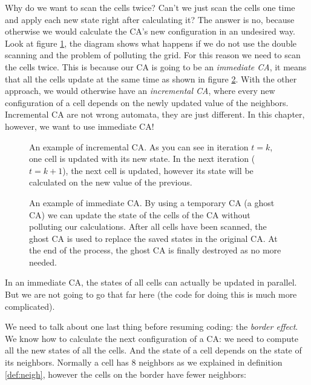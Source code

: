 Why do we want to scan the cells twice? Can't we just scan the cells one time and apply each new state
right after calculating it? The answer is no, because otherwise we would calculate the CA's new configuration
in an undesired way. Look at figure \ref{fig:updatecainc},
the diagram shows what happens if we do not use the double
scanning and the problem of polluting the grid. For this reason we need to scan the cells twice. This is because
our CA is going to be an \textit{immediate CA}, it means that all the cells update at the same time
as shown in figure \ref{fig:updatecaimm}.
With the other
approach, we would otherwise have an \textit{incremental CA}, where every new configuration of a cell depends on the
newly updated value of the neighbors. Incremental CA are not wrong automata,
they are just different. In this chapter,
however, we want to use immediate CA!

%
\begin{figure}[b]
\sidecaption

%
%
\caption{An example of incremental CA. As you can see in iteration $t=k$, one cell is updated
with its new state. In the next iteration ($t=k+1$), the next cell is updated, however its state
will be calculated on the new value of the previous.}
\label{fig:updatecainc}
\end{figure}
%

%
\begin{figure}[b]
\sidecaption

%
%
\caption{An example of immediate CA. By using a temporary CA (a ghost CA) we can update
the state of the cells of the CA without polluting our calculations. After all cells have been scanned, the
ghost CA is used to replace the saved states in the original CA. At the end of the process, the ghost CA is
finally destroyed as no more needed.}
\label{fig:updatecaimm}
\end{figure}
%

In an immediate CA, the states of all cells can actually be updated in parallel. But we are not going to go
that far here (the code for doing this is much more complicated).

We need to talk about one last thing before resuming coding: the \textit{border effect}. We know how to
calculate the next configuration of a CA: we need to compute all the new states of all the cells. And the state
of a cell depends on the state of its neighbors. Normally a cell has 8 neighbors as we explained in definition
\ref{def:neigh}, however the cells on the border have fewer neighbors:

